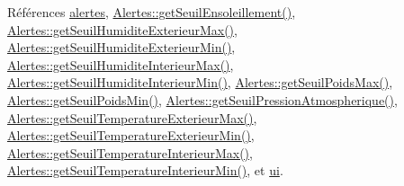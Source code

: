 Références \hyperlink{class_reglages_alertes_ihm_a9afa97e737d3c6a9a28a23fc4bc4beeb}{alertes}, \hyperlink{class_alertes_a54900058557979664d25137399ae2512}{Alertes\+::get\+Seuil\+Ensoleillement()}, \hyperlink{class_alertes_ad2c8daf5668f5d122efb9b84f7ea86de}{Alertes\+::get\+Seuil\+Humidite\+Exterieur\+Max()}, \hyperlink{class_alertes_a68e467e042b615f56347a0953d6e64f1}{Alertes\+::get\+Seuil\+Humidite\+Exterieur\+Min()}, \hyperlink{class_alertes_a86e0bb83ac1fa5e704e3b7b3fc7147cd}{Alertes\+::get\+Seuil\+Humidite\+Interieur\+Max()}, \hyperlink{class_alertes_a40d47b65952035b78cac05b915ad57b8}{Alertes\+::get\+Seuil\+Humidite\+Interieur\+Min()}, \hyperlink{class_alertes_a2c19b460f7f7cc7a867b5ed634371878}{Alertes\+::get\+Seuil\+Poids\+Max()}, \hyperlink{class_alertes_a228829e2826ee20cc014b2eb54addf14}{Alertes\+::get\+Seuil\+Poids\+Min()}, \hyperlink{class_alertes_a502fa36037246fb6eaad1db859bc1971}{Alertes\+::get\+Seuil\+Pression\+Atmospherique()}, \hyperlink{class_alertes_a00d834877e1fc34d7e0659ef6963ac4f}{Alertes\+::get\+Seuil\+Temperature\+Exterieur\+Max()}, \hyperlink{class_alertes_a4451c6b077256d838e584a073444d83d}{Alertes\+::get\+Seuil\+Temperature\+Exterieur\+Min()}, \hyperlink{class_alertes_ac514ebef5e7e65aa7bee0ebe3cd7e883}{Alertes\+::get\+Seuil\+Temperature\+Interieur\+Max()}, \hyperlink{class_alertes_af61b11556d97f923cf7dd25ac4f5dd05}{Alertes\+::get\+Seuil\+Temperature\+Interieur\+Min()}, et \hyperlink{class_reglages_alertes_ihm_af3a1fcc84fb1c76248b330372947b245}{ui}.


